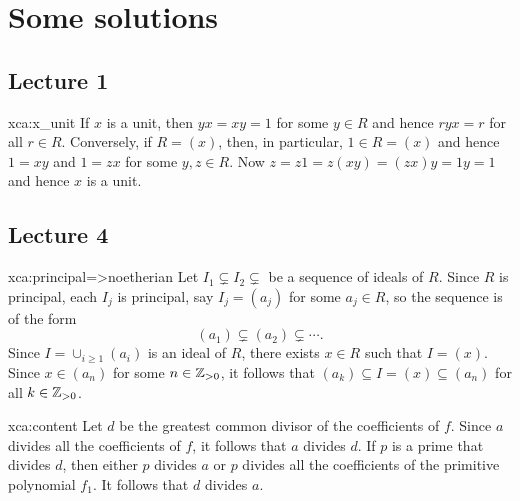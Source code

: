 \chapter*{Some solutions}

\section*{Lecture 1}

\begin{sol}{xca:x_unit}
If $x$ is a unit, then $yx=xy=1$ for some $y\in R$ and hence $ryx=r$ for all $r\in R$. Conversely, 
if $R=(x)$, then, in particular, $1\in R=(x)$ and hence $1=xy$ and $1=zx$ for some $y,z\in R$. Now
$z=z1=z(xy)=(zx)y=1y=1$ and hence $x$ is a unit. 
\end{sol}

\section*{Lecture 4}

\begin{sol}{xca:principal=>noetherian}
	Let $I_1\subsetneq I_2\subsetneq$ be a sequence of ideals of $R$.  
	Since $R$ is principal, each $I_j$ is principal, 
	say $I_j=(a_j)$ for some $a_j\in R$, so the sequence is of the form
	\[
	(a_1)\subsetneq (a_2)\subsetneq\cdots.
	\]
	Since $I=\cup_{i\geq1}(a_i)$ is an ideal of $R$, 
	there exists $x\in R$ such that $I=(x)$. Since $x\in (a_n)$ for some $n\in\mathbb{Z}_{>0}$, 
	it follows that $(a_k)\subseteq I=(x)\subseteq (a_n)$ for all $k\in\mathbb{Z}_{>0}$. 
\end{sol}

\begin{sol}{xca:content}
	Let $d$ be 
	the greatest common divisor
	of the coefficients of $f$. 
	Since $a$ divides all the coefficients of $f$, it follows that $a$ divides $d$. If $p$ is a prime that
	divides $d$, then either $p$ divides $a$ or $p$ divides all the coefficients of the primitive
	polynomial $f_1$. It follows that $d$ divides $a$.    
\end{sol}

